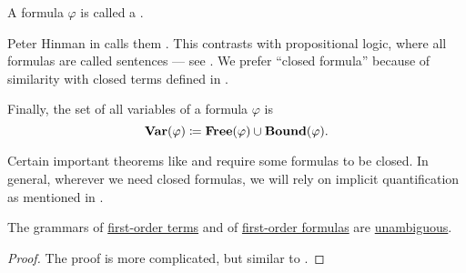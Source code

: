 \begin{definition}
\begin{thmenum}
     A formula \( \varphi \) is called a .

    Peter Hinman in \cite[def. 2.2.7]{Hinman2005} calls them . This contrasts with propositional logic, where all formulas are called sentences --- see . We prefer \enquote{closed formula} because of similarity with closed terms defined in .

     Finally, the set of all variables of a formula \( \varphi \) is
    \begin{equation}\label{eq:def:first_order_syntax/formula_variables}
      \operatorname{\mathbf{Var}}(\varphi) \coloneqq \operatorname{\mathbf{Free}}(\varphi) \cup \operatorname{\mathbf{Bound}}(\varphi).
    \end{equation}
  \end{thmenum}
\end{definition}
\begin{comments}
  \item Certain important theorems like  and  require some formulas to be closed. In general, wherever we need closed formulas, we will rely on implicit quantification as mentioned in .
\end{comments}

\begin{proposition}\label{thm:first_order_terms_and_formulas_are_unambiguous}
  The grammars of \hyperref[def:first_order_syntax/term]{first-order terms} and of \hyperref[def:first_order_syntax/formula]{first-order formulas} are \hyperref[def:grammar_ambiguity]{unambiguous}.
\end{proposition}
\begin{proof}
  The proof is more complicated, but similar to .
\end{proof}

